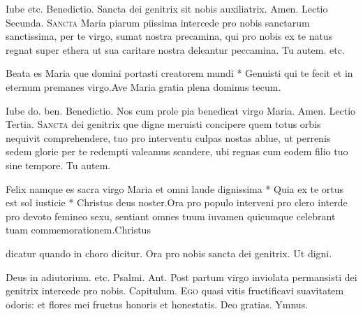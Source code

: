\begin{multicols*}{2}
Iube etc. {\color{Red} Benedictio.} Sancta dei genitrix sit nobis auxiliatrix. Amen. {\color{Red} Lectio Secunda.}
\lettrine[lines=2]{\zallmancaps \color{Red} S}{ancta} Maria piarum piissima intercede pro nobis sanctarum sanctissima, per te virgo, sumat nostra precamina, qui pro nobis ex te natus regnat super ethera ut sua caritare nostra deleantur peccamina. Tu autem. etc.
\begin{responsory}[beata-es]
{Beata es Maria que domini portasti creatorem mundi * Genuisti qui te fecit et in eternum premanes virgo.}{Ave Maria gratia plena dominus tecum.}
\end{responsory}
Iube do. ben. {\color{Red} Benedictio.} Nos cum prole pia benedicat virgo Maria. Amen. {\color{Red} Lectio Tertia.}
\lettrine[lines=2]{\zallmancaps \color{Blue} S}{ancta} dei genitrix que digne meruisti concipere quem totus orbis nequivit comprehendere, tuo pro interventu culpas nostas ablue, ut perrenis sedem glorie per te redempti valeamus scandere, ubi regnas cum eodem filio tuo sine tempore. Tu autem.
\begin{responsory-final}
{Felix namque es sacra virgo Maria et omni laude dignissima * Quia ex te ortus est sol iusticie * Christus deus noster.}{Ora pro populo interveni pro clero interde pro devoto femineo sexu, sentiant omnes tuum iuvamen quicumque celebrant tuam commemorationem.}{Christus}
\end{responsory-final}
 {\color{Red} dicatur quando in choro dicitur.} \V Ora pro nobis sancta dei genitrix. \R Ut digni.
{\color{Red} }
\par \noindent Deus in adiutorium. etc. {\color{Red} Psalmi.}
{\color{Red} Ant.} Post partum virgo inviolata permansisti dei genitrix intercede pro nobis. {\color{Red} Capitulum.}
\lettrine[lines=2]{\zallmancaps \color{Red} E}{go} quasi vitis fructificavi suavitatem odoris: et flores mei fructus honoris et honestatis. Deo gratias. {\color{Red} Ymnus.}
\end{multicols*}
